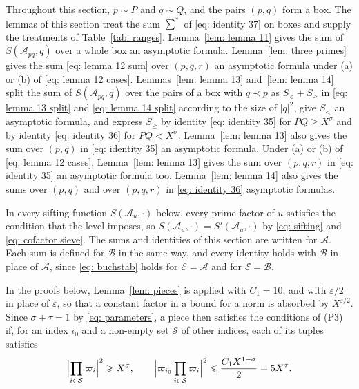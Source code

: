 \documentclass{article}
\numberwithin{equation}{section}
\newcommand{\Le}{\leqslant}
\newcommand{\Ge}{\geqslant}
\begin{document}
Throughout this section, $p \sim P$ and $q \sim Q$, and the pairs $(p, q)$ form a box. The lemmas of this section treat the sum $\sum^*$ of \eqref{eq: identity 37} on boxes and supply the treatments of Table~\ref{tab: ranges}. Lemma~\ref{lem: lemma 11} gives the sum of $S(\mathcal{A}_{pq}, q)$ over a whole box an asymptotic formula. Lemma~\ref{lem: three primes} gives the sum \eqref{eq: lemma 12 sum} over $(p, q, r)$ an asymptotic formula under (a) or (b) of \eqref{eq: lemma 12 cases}. Lemmas~\ref{lem: lemma 13} and~\ref{lem: lemma 14} split the sum of $S(\mathcal{A}_{pq}, q)$ over the pairs of a box with $q \prec p$ as $S_< + S_\Ge$ in \eqref{eq: lemma 13 split} and \eqref{eq: lemma 14 split} according to the size of $|q|^2$, give $S_<$ an asymptotic formula, and express $S_\Ge$ by identity \eqref{eq: identity 35} for $PQ \Ge X^{\sigma}$ and by identity \eqref{eq: identity 36} for $PQ < X^{\sigma}$. Lemma~\ref{lem: lemma 13} also gives the sum over $(p, q)$ in \eqref{eq: identity 35} an asymptotic formula. Under (a) or (b) of \eqref{eq: lemma 12 cases}, Lemma~\ref{lem: lemma 13} gives the sum over $(p, q, r)$ in \eqref{eq: identity 35} an asymptotic formula too. Lemma~\ref{lem: lemma 14} also gives the sums over $(p, q)$ and over $(p, q, r)$ in \eqref{eq: identity 36} asymptotic formulas.

In every sifting function $S(\mathcal{A}_u, \cdot)$ below, every prime factor of $u$ satisfies the condition that the level imposes, so $S(\mathcal{A}_u, \cdot) = S'(\mathcal{A}_u, \cdot)$ by \eqref{eq: sifting} and \eqref{eq: cofactor sieve}. The sums and identities of this section are written for $\mathcal{A}$. Each sum is defined for $\mathcal{B}$ in the same way, and every identity holds with $\mathcal{B}$ in place of $\mathcal{A}$, since \eqref{eq: buchstab} holds for $\mathcal{E} = \mathcal{A}$ and for $\mathcal{E} = \mathcal{B}$.

In the proofs below, Lemma~\ref{lem: pieces} is applied with $C_1 = 10$, and with $\varepsilon/2$ in place of $\varepsilon$, so that a constant factor in a bound for a norm is absorbed by $X^{\varepsilon/2}$. Since $\sigma + \tau = 1$ by \eqref{eq: parameters}, a piece then satisfies the conditions of (P3) if, for an index $i_0$ and a non-empty set $\mathcal{S}$ of other indices, each of its tuples satisfies
\begin{equation}
\label{eq: P3 criterion}
\Bigl| \prod_{i \in \mathcal{S}} \varpi_i \Bigr|^2 \Ge X^{\sigma}, \qquad \Bigl| \varpi_{i_0} \prod_{i \in \mathcal{S}} \varpi_i \Bigr|^2 \Le \frac{C_1 X^{1 - \sigma}}{2} = 5X^{\tau}.
\end{equation}
\end{document}
